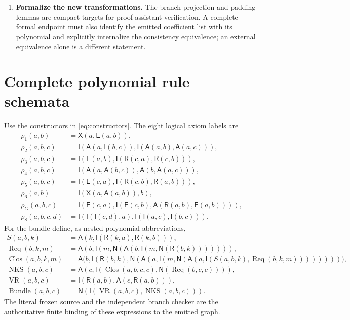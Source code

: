 \documentclass[11pt,a4paper]{article}
\theoremstyle{definition}\newtheorem{definition}[theorem]{Definition}
\theoremstyle{remark}\newtheorem{remark}[theorem]{Remark}
\newcommand{\Imp}{\mathsf I}\newcommand{\Rel}{\mathsf R}\newcommand{\All}{\mathsf A}
\newcommand{\Eq}{\mathsf E}\newcommand{\Neg}{\mathsf N}\newcommand{\Ex}{\mathsf X}
\numberwithin{equation}{section}
\begin{document}
\begin{enumerate}
      A worthwhile result must materialize its actual coefficients and
      compare the resulting degree, numeral size and arithmetic graph
      against the existing native constructions. An abstract appeal to
      MRDP is not a completed improvement.
\item \textbf{Formalize the new transformations.}
      The branch projection and padding lemmas are compact targets for
      proof-assistant verification. A complete formal endpoint must also
      identify the emitted coefficient list with its polynomial and
      explicitly internalize the consistency equivalence; an external
      equivalence alone is a different statement.
\end{enumerate}

\appendix
\section{Complete polynomial rule schemata}
\label{app:rules}

Use the constructors in \eqref{eq:constructors}. The eight logical axiom
labels are
\begin{align*}
 \rho_1(a,b)&=\Ex(a,\Eq(a,b)),\\
 \rho_2(a,b,c)&=\Imp(\All(a,\Imp(b,c)),
                     \Imp(\All(a,b),\All(a,c))),\\
 \rho_3(a,b,c)&=\Imp(\Eq(a,b),\Imp(\Rel(c,a),\Rel(c,b))),\\
 \rho_4(a,b,c)&=\Imp(\All(a,\All(b,c)),\All(b,\All(a,c))),\\
 \rho_5(a,b,c)&=\Imp(\Eq(c,a),\Imp(\Rel(c,b),\Rel(a,b))),\\
 \rho_6(a,b)&=\Imp(\Ex(a,\All(a,b)),b),\\
 \rho_G(a,b,c)&=\Imp(\Eq(c,a),
                \Imp(\Eq(c,b),\All(\Rel(a,b),\Eq(a,b)))),\\
 \rho_8(a,b,c,d)&=\Imp(\Imp(\Imp(c,d),a),
                           \Imp(\Imp(a,c),\Imp(b,c))).
\end{align*}
For the bundle define, as nested polynomial abbreviations,
\begin{align*}
 S(a,b,k)&=\All(k,\Imp(\Rel(k,a),\Rel(k,b))),\\
 \operatorname{Req}(b,k,m)
  &=\All(b,\Imp(m,\Neg(\All(b,\Imp(m,\Neg(\Rel(b,k))))))),\\
 \operatorname{Clos}(a,b,k,m)
  &=\All\bigl(b,\Imp(\Rel(b,k),
       \Neg(\All(a,\Imp(m,
          \Neg(\All(a,\Imp(S(a,b,k),\operatorname{Req}(b,k,m))))))))\bigr),\\
 \operatorname{NKS}(a,b,c)
  &=\All(c,\Imp(\operatorname{Clos}(a,b,c,c),
                         \Neg(\operatorname{Req}(b,c,c)))),\\
 \operatorname{VR}(a,b,c)&=\Imp(\Rel(a,b),\All(c,\Rel(a,b))),\\
 \operatorname{Bundle}(a,b,c)
  &=\Neg(\Imp(\operatorname{VR}(a,b,c),\operatorname{NKS}(a,b,c))).
\end{align*}
The literal frozen source and the independent branch checker are the
authoritative finite binding of these expressions to the emitted graph.
\end{document}
